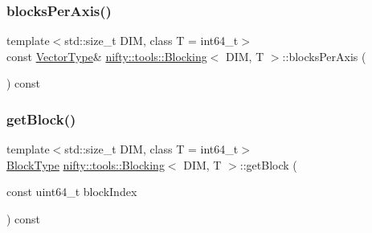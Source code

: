 \subsubsection{\texorpdfstring{blocks\+Per\+Axis()}{blocksPerAxis()}}
{\footnotesize\ttfamily template$<$std\+::size\+\_\+t D\+IM, class T  = int64\+\_\+t$>$ \\
const \hyperlink{classnifty_1_1tools_1_1Blocking_a5f8df3d4cdf09803217d729a04018fb3}{Vector\+Type}\& \hyperlink{classnifty_1_1tools_1_1Blocking}{nifty\+::tools\+::\+Blocking}$<$ D\+IM, T $>$\+::blocks\+Per\+Axis (\begin{DoxyParamCaption}{ }\end{DoxyParamCaption}) const\hspace{0.3cm}{\ttfamily [inline]}}

\mbox{\label{classnifty_1_1tools_1_1Blocking_ad5f32d8ff7c1c9b36035ad572ceee0be}} 
\subsubsection{\texorpdfstring{get\+Block()}{getBlock()}}
{\footnotesize\ttfamily template$<$std\+::size\+\_\+t D\+IM, class T  = int64\+\_\+t$>$ \\
\hyperlink{classnifty_1_1tools_1_1Blocking_a597e0d4186d2d40ccb96698cc16775c6}{Block\+Type} \hyperlink{classnifty_1_1tools_1_1Blocking}{nifty\+::tools\+::\+Blocking}$<$ D\+IM, T $>$\+::get\+Block (\begin{DoxyParamCaption}\item[{const uint64\+\_\+t}]{block\+Index }\end{DoxyParamCaption}) const\hspace{0.3cm}{\ttfamily [inline]}}

\mbox{\label{classnifty_1_1tools_1_1Blocking_aa295ddc729d0cfd5ac90d18573d96b26}} 
